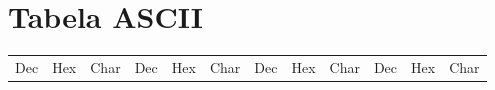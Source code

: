 \documentclass{book}
\begin{document}


%



\appendix
\chapter{Tabela ASCII}

{\tt\small

\begin{tabular}{|lll|lll|lll|lll|}

  Dec &   Hex & Char &  Dec &   Hex & Char &  Dec &   Hex & Char &  Dec &   Hex & Char \\


\end{tabular}}
\end{document}
